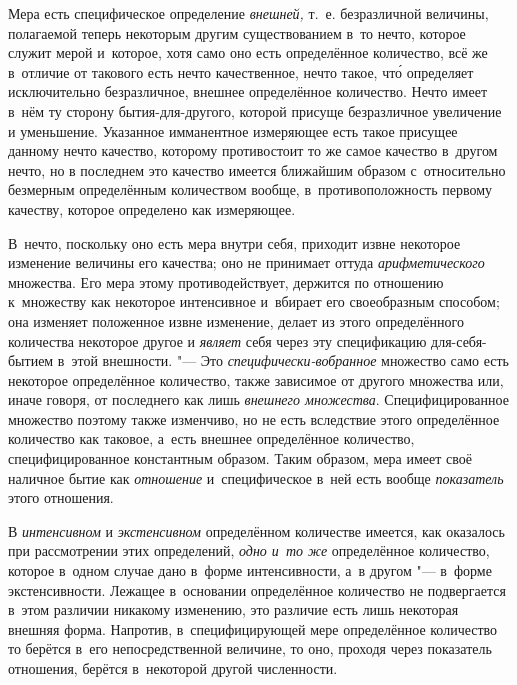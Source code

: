 
Мера есть специфическое определение {\em внешней,} т.~е. безразличной величины,
полагаемой теперь некоторым другим существованием в~то нечто, которое служит
мерой и~которое, хотя само оно есть определённое количество, всё же в~отличие
от такового есть нечто качественное, нечто такое, чт\'{о} определяет
исключительно безразличное, внешнее определённое количество. Нечто имеет в~нём
ту сторону бытия-для-другого, которой присуще безразличное увеличение и
уменьшение. Указанное имманентное измеряющее есть такое присущее данному нечто
качество, которому противостоит то же самое качество в~другом нечто, но в
последнем это качество имеется ближайшим образом с~относительно безмерным
определённым количеством вообще, в~противоположность первому качеству, которое
определено как измеряющее.

В~нечто, поскольку оно есть мера внутри себя, приходит извне некоторое
изменение величины его качества; оно не принимает оттуда {\em арифметического}
множества. Его мера этому противодействует, держится по отношению к~множеству
как некоторое интенсивное и~вбирает его своеобразным способом; она изменяет
положенное извне изменение, делает из этого определённого количества некоторое
другое и {\em являет} себя через эту спецификацию для-себя-бытием в~этой
внешности. "--- Это {\em специфически-вобранное} множество само есть некоторое
определённое количество, также зависимое от другого множества или, иначе
говоря, от последнего как лишь {\em внешнего множества}. Специфицированное
множество поэтому также изменчиво, но не есть вследствие этого определённое
количество как таковое, а~есть внешнее определённое количество,
специфицированное константным образом. Таким образом, мера имеет своё наличное
бытие как {\em отношение} и~специфическое в~ней есть вообще {\em показатель}
этого отношения.

В {\em интенсивном} и {\em экстенсивном} определённом количестве имеется, как
оказалось при рассмотрении этих определений, {\em одно и~то же} определённое
количество, которое в~одном случае дано в~форме интенсивности, а~в другом "---
в~форме экстенсивности. Лежащее в~основании определённое количество не
подвергается в~этом различии никакому изменению, это различие есть лишь
некоторая внешняя форма. Напротив, в~специфицирующей мере определённое
количество то берётся в~его непосредственной величине, то оно, проходя через
показатель отношения, берётся в~некоторой другой численности.


